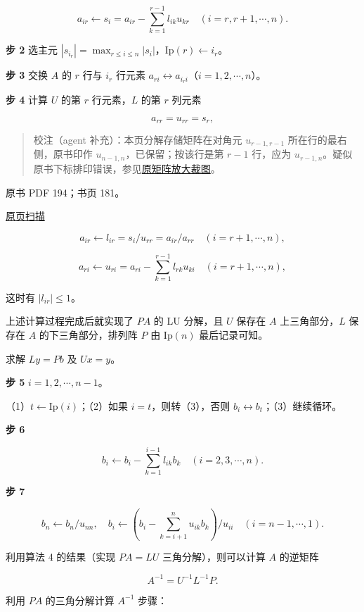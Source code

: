\documentclass[
  10pt,
  fontset=fandol]{ctexart}
\begin{document}
\[a_{ir}\leftarrow s_i=a_{ir}-\sum_{k=1}^{r-1}l_{ik}u_{kr}\quad(i=r,r+1,\cdots,n).\]

\textbf{步 2} 选主元 \(|s_{i_r}|=\max_{r\le i\le n}|s_i|\)，\(\mathrm{Ip}(r)\leftarrow i_r\)。

\textbf{步 3} 交换 \(A\) 的 \(r\) 行与 \(i_r\) 行元素 \(a_{ri}\leftrightarrow a_{i_ri}\)（\(i=1,2,\cdots,n\)）。

\textbf{步 4} 计算 \(U\) 的第 \(r\) 行元素，\(L\) 的第 \(r\) 列元素

\[a_{rr}=u_{rr}=s_r,\]

\begin{quote}
校注（agent 补充）：本页分解存储矩阵在对角元 \(u_{r-1,r-1}\) 所在行的最右侧，原书印作 \(u_{n-1,n}\)，已保留；按该行是第 \(r-1\) 行，应为 \(u_{r-1,n}\)。疑似原书下标排印错误，参见\href{../../../staging/ch07a/assets/pdf-193-storage-detail.png}{原矩阵放大裁图}。
\end{quote}

\clearpage

原书 PDF 194；书页 181。

\href{../../../source-images/pdf-194.jpeg}{原页扫描}

\[a_{ir}\leftarrow l_{ir}=s_i/u_{rr}=a_{ir}/a_{rr}\quad(i=r+1,\cdots,n),\]

\[a_{ri}\leftarrow u_{ri}=a_{ri}-\sum_{k=1}^{r-1}l_{rk}u_{ki}\quad(i=r+1,\cdots,n),\]

这时有 \(|l_{ir}|\le1\)。

上述计算过程完成后就实现了 \(PA\) 的 LU 分解，且 \(U\) 保存在 \(A\) 上三角部分，\(L\) 保存在 \(A\) 的下三角部分，排列阵 \(P\) 由 \(\mathrm{Ip}(n)\) 最后记录可知。

求解 \(Ly=Pb\) 及 \(Ux=y\)。

\textbf{步 5} \(i=1,2,\cdots,n-1\)。

（1）\(t\leftarrow\mathrm{Ip}(i)\)；（2）如果 \(i=t\)，则转（3），否则 \(b_i\leftrightarrow b_t\)；（3）继续循环。

\textbf{步 6}

\[b_i\leftarrow b_i-\sum_{k=1}^{i-1}l_{ik}b_k\quad(i=2,3,\cdots,n).\]

\textbf{步 7}

\[b_n\leftarrow b_n/u_{nn},\quad b_i\leftarrow\left(b_i-\sum_{k=i+1}^{n}u_{ik}b_k\right)/u_{ii}\quad(i=n-1,\cdots,1).\]

利用算法 4 的结果（实现 \(PA=LU\) 三角分解），则可以计算 \(A\) 的逆矩阵

\[A^{-1}=U^{-1}L^{-1}P.\]

利用 \(PA\) 的三角分解计算 \(A^{-1}\) 步骤：
\end{document}
